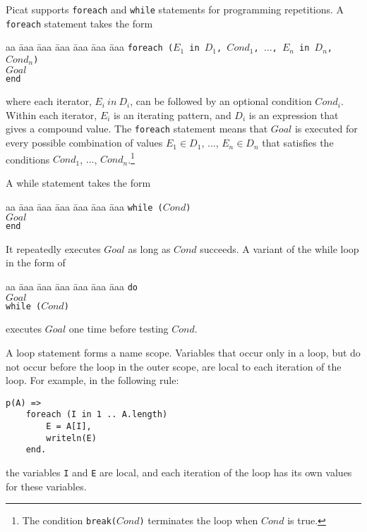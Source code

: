 Picat supports \texttt{foreach} and \texttt{while} statements for programming repetitions. A \texttt{foreach} statement takes the form
\begin{tabbing}
aa \= aaa \= aaa \= aaa \= aaa \= aaa \= aaa \kill
\> \texttt{foreach ($E_1$ in $D_1$, $Cond_1$, $\ldots$, $E_n$ in $D_n$, $Cond_n$)}  \\
\> \> $Goal$ \\
\>  \texttt{end} 
\end{tabbing}
where each iterator, $E_i\ in\ D_i$, can be followed by an optional condition $Cond_i$.  Within each iterator, $E_i$ is an iterating pattern, and $D_i$ is an expression that gives a compound value. The \texttt{foreach} statement means that $Goal$ is executed for every possible combination of values $E_1 \in D_1$, $\ldots$, $E_n \in D_n$ that satisfies the conditions \texttt{$Cond_1$}, $\ldots$, \texttt{$Cond_n$}.\footnote{The condition \texttt{break($Cond$)} terminates the loop when $Cond$ is true.}

A while statement takes the form 
\begin{tabbing}
aa \= aaa \= aaa \= aaa \= aaa \= aaa \= aaa \kill
\> \texttt{while ($Cond$)} \\
\> \> $Goal$  \\
\>  \texttt{end}
\end{tabbing} 
It repeatedly executes $Goal$ as long as $Cond$ succeeds. A variant of the while loop in the form of 
\begin{tabbing}
aa \= aaa \= aaa \= aaa \= aaa \= aaa \= aaa \kill
\> \texttt{do} \\
\> \> $Goal$  \\
\>  \texttt{while ($Cond$)}
\end{tabbing}
executes $Goal$ one time before testing $Cond$.

A loop statement forms a name scope. Variables that occur only in a loop, but do not occur before the loop in the outer scope, are local to each iteration of the loop. For example, in the following rule:
\begin{verbatim}
p(A) =>
    foreach (I in 1 .. A.length)
        E = A[I],
        writeln(E)
    end.
\end{verbatim}
the variables \texttt{I} and \texttt{E} are local, and each iteration of the loop has its own values for these variables.

